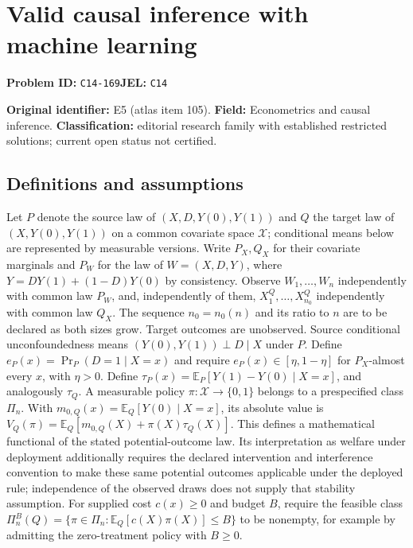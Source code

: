 \documentclass[11pt,a4paper]{article}
\begin{document}
\section*{Valid causal inference with machine learning}
\textbf{Problem ID:} \texttt{C14-169}\quad \textbf{JEL:} \texttt{C14}\par
\label{problem:OP-0105}
\label{atlas:prob:E5}

\noindent\textbf{Original identifier:} E5 (atlas item 105). \textbf{Field:} Econometrics and causal inference. \textbf{Classification:} editorial research family with established restricted solutions; current open status not certified.

\subsection*{Definitions and assumptions}

Let $P$ denote the source law of $(X,D,Y(0),Y(1))$ and $Q$ the target law of $(X,Y(0),Y(1))$ on a common covariate space $\mathcal X$; conditional means below are represented by measurable versions. Write $P_X,Q_X$ for their covariate marginals and $P_W$ for the law of $W=(X,D,Y)$, where $Y=DY(1)+(1-D)Y(0)$ by consistency. Observe $W_1,\ldots,W_n$ independently with common law $P_W$, and, independently of them, $X_1^Q,\ldots,X_{n_0}^Q$ independently with common law $Q_X$. The sequence $n_0=n_0(n)$ and its ratio to $n$ are to be declared as both sizes grow. Target outcomes are unobserved. Source conditional unconfoundedness means $(Y(0),Y(1))\perp D\mid X$ under $P$. Define $e_P(x)=\Pr_P(D=1\mid X=x)$ and require $e_P(x)\in[\eta,1-\eta]$ for $P_X$-almost every $x$, with $\eta>0$. Define $\tau_P(x)=\mathbb E_P[Y(1)-Y(0)\mid X=x]$, and analogously $\tau_Q$. A measurable policy $\pi:\mathcal X\to\{0,1\}$ belongs to a prespecified class $\Pi_n$. With $m_{0,Q}(x)=\mathbb E_Q[Y(0)\mid X=x]$, its absolute value is $V_Q(\pi)=\mathbb E_Q[m_{0,Q}(X)+\pi(X)\tau_Q(X)]$. This defines a mathematical functional of the stated potential-outcome law. Its interpretation as welfare under deployment additionally requires the declared intervention and interference convention to make these same potential outcomes applicable under the deployed rule; independence of the observed draws does not supply that stability assumption. For supplied cost $c(x)\ge0$ and budget $B$, require the feasible class $\Pi_n^B(Q)=\{\pi\in\Pi_n:\mathbb E_Q[c(X)\pi(X)]\le B\}$ to be nonempty, for example by admitting the zero-treatment policy with $B\ge0$.
\end{document}
